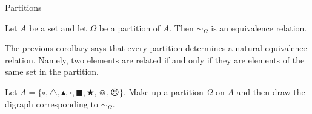 \begin{section}{Partitions}
\begin{corollary}
Let $A$ be a set and let $\Omega$ be a partition of $A$.  Then $\sim_{\Omega}$ is an equivalence relation.
\end{corollary}

The previous corollary says that every partition determines a natural equivalence relation.  Namely, two elements are related if and only if they are elements of the same set in the partition.

\begin{exercise}
Let $A=\{\circ, \triangle, \blacktriangle, \square, \blacksquare, \bigstar, \smiley, \frownie\}$.  Make up a partition $\Omega$ on $A$ and then draw the digraph corresponding to $\sim_{\Omega}$.
\end{exercise}

\end{section}